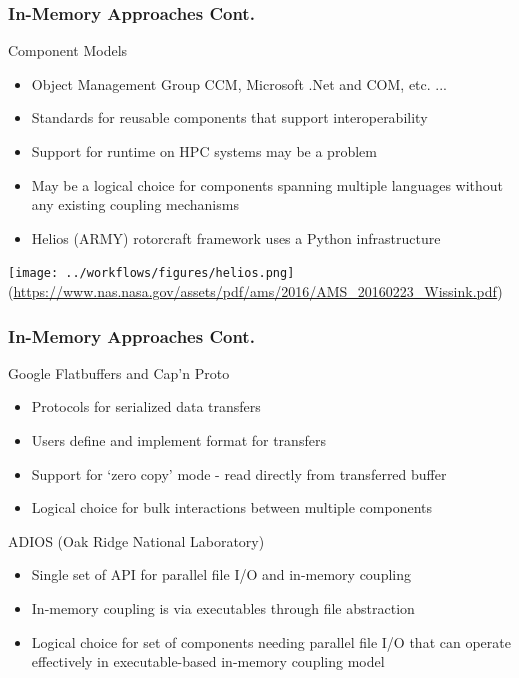 \documentclass{beamer}
\begin{document}
\begin{frame}
  \frametitle{In-Memory Approaches Cont.}
  Component Models
  \begin{itemize}
    \item Object Management Group CCM, Microsoft .Net and COM, etc. ...
    \item Standards for reusable components that support interoperability
    \item Support for runtime on HPC systems may be a problem
    \item May be a logical choice for components spanning multiple languages
      without any existing coupling mechanisms
    \item Helios (ARMY) rotorcraft framework uses a Python infrastructure
  \end{itemize}
  \centering
  \texttt{[image: ../workflows/figures/helios.png]}\\
  \tiny
  (\url{https://www.nas.nasa.gov/assets/pdf/ams/2016/AMS_20160223_Wissink.pdf})
\end{frame}

\begin{frame}
  \frametitle{In-Memory Approaches Cont.}
  Google Flatbuffers and Cap'n Proto
  \begin{itemize}
    \item Protocols for serialized data transfers
    \item Users define and implement format for transfers
    \item Support for `zero copy' mode - read directly from transferred buffer
    \item Logical choice for bulk interactions between multiple components 
  \end{itemize}
  ADIOS (Oak Ridge National Laboratory)
  \begin{itemize}
    \item Single set of API for parallel file I/O and in-memory coupling
    \item In-memory coupling is via executables through file abstraction
    \item Logical choice for set of components needing parallel file I/O that
      can operate effectively in executable-based in-memory coupling model
  \end{itemize}
\end{frame}
\end{document}
